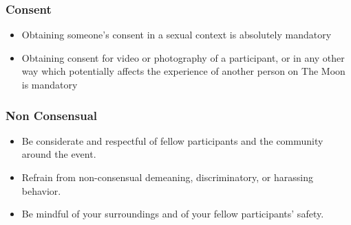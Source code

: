 	\subsubsection*{Consent}
    \begin{itemize}[noitemsep]
    	\item Obtaining someone’s consent in a sexual context is absolutely mandatory
        \item Obtaining consent for video or photography of a participant, or in any other way which potentially affects the experience of another person on The Moon is mandatory
	\end{itemize}
        
    \subsubsection*{Non Consensual}
    \begin{itemize}[noitemsep]
        \item Be considerate and respectful of fellow participants and the community around the event.
        \item Refrain from non-consensual demeaning, discriminatory, or harassing behavior.
        \item Be mindful of your surroundings and of your fellow participants’ safety.
	\end{itemize}


